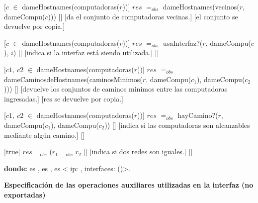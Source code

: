 \begin{Interfaz}
  [$c$ $\in$ dameHostnames(computadoras($r$))]
  {$res$ $=_{obs}$ dameHostnames(vecinos($r$, dameCompu($c$)))}
  []
  [da el conjunto de computadoras vecinas.]
  [el conjunto se devuelve por copia.]

  [$c$ $\in$ dameHostnames(computadoras($r$))]
  {$res$ $=_{obs}$ usaInterfaz?($r$, dameCompu($c$), $i$)}
  []
  [indica si la interfaz est\'a siendo utilizada.]
  []

\newpage

  [$c1,\ c2$ $\in$ dameHostnames(computadoras($r$))]
  {$res$ $=_{obs}$ dameCaminosdeHostnames(caminosMinimos($r$, dameCompu($c_1$), dameCompu($c_2$)))}
  []
  [devuelve los conjuntos de caminos minimos entre las computadoras ingresadas.]
  [res se devuelve por copia.]
  
  [$c1,\ c2$ $\in$ dameHostnames(computadoras($r$))]
  {$res$ $=_{obs}$ hayCamino?($r$, dameCompu($c_1$), dameCompu($c_2$))}
  []
  [indica si las computadoras son alcanzables mediante alg\'un camino.]
  []
  
  [true]
  {$res$ =$_{obs}$ ($r_1$ =$_{obs}$ $r_2$}%
  []
  [indica si dos redes son iguales.]
  [] 
  
   \textbf{donde:} \newline 
    es , \newline
    es , \newline
    es < ip: , interfaces: ()>.
   
\end{Interfaz}

\textbf{} %

\textbf{Especificaci\'on de las operaciones auxiliares utilizadas en la interfaz (no exportadas)}

